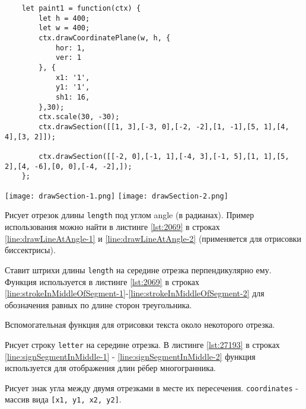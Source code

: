 \begin{lstlisting}
    let paint1 = function(ctx) {
        let h = 400;
        let w = 400;
        ctx.drawCoordinatePlane(w, h, {
            hor: 1,
            ver: 1
        }, {
            x1: '1',
            y1: '1',
            sh1: 16,
        },30);
        ctx.scale(30, -30);
        ctx.drawSection([[1, 3],[-3, 0],[-2, -2],[1, -1],[5, 1],[4, 4],[3, 2]]);

        ctx.drawSection([[-2, 0],[-1, 1],[-4, 3],[-1, 5],[1, 1],[5, 2],[4, -6],[0, 0],[-4, -2],]);
    };
    \end{lstlisting}
    \texttt{[image: drawSection-1.png]}
    \texttt{[image: drawSection-2.png]}

Рисует отрезок длины \texttt{length} под углом angle (в радианах). Пример использования можно найти в листинге \ref{lst:2069} в строках \ref{line:drawLineAtAngle-1} и \ref{line:drawLineAtAngle-2} (применяется для отрисовки биссектрисы). 

Ставит штрихи длины \texttt{length} на середине отрезка перпендикулярно ему. Функция используется в листинге \ref{lst:2069} в строках \ref{line:strokeInMiddleOfSegment-1}-\ref{line:strokeInMiddleOfSegment-2} для обозначения равных по длине сторон треугольника.

Вспомогательная функция для отрисовки текста около некоторого отрезка.

Рисует строку \texttt{letter} на середине отрезка. В листинге \ref{lst:27193} в строках \ref{line:signSegmentInMiddle-1} - \ref{line:signSegmentInMiddle-2} функция используется для отображения длин рёбер многогранника.

Рисует знак угла между двумя отрезками в месте их пересечения. \texttt{coordinates} - массив вида \texttt{[x1, y1, x2, y2]}.

